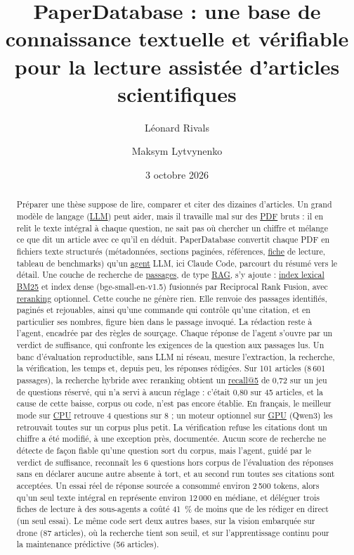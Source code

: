 \documentclass[11pt,a4paper]{article}
\title{\textbf{PaperDatabase} : une base de connaissance textuelle et vérifiable\\
  pour la lecture assistée d'articles scientifiques}
\author{Léonard Rivals \and Maksym Lytvynenko}
\date{3 octobre 2026}
\newcommand{\gl}[2]{\hyperlink{gl:#1}{\textcolor{glcolor}{#2}}}
\begin{document}
\maketitle

\begin{abstract}
Préparer une thèse suppose de lire, comparer et citer des dizaines d'articles. Un grand
modèle de langage (\gl{LLM}{LLM}) peut aider, mais il travaille mal sur des \gl{PDF}{PDF} bruts : il en relit le
texte intégral à chaque question, ne sait pas où chercher un chiffre et mélange ce que dit un
article avec ce qu'il en déduit. PaperDatabase convertit chaque PDF en fichiers texte
structurés (métadonnées, sections paginées, références, \gl{fiche}{fiche} de lecture, tableau de
benchmarks) qu'un \gl{agent}{agent} LLM, ici Claude Code, parcourt du résumé vers le détail. Une couche
de recherche de \gl{passage}{passages}, de type \gl{RAG}{RAG}, s'y ajoute : \gl{index}{index lexical} \gl{BM25}{BM25} et index dense
(bge-small-en-v1.5) fusionnés par Reciprocal Rank Fusion, avec \gl{reranking}{reranking} optionnel. Cette
couche ne génère rien. Elle renvoie des passages identifiés, paginés et rejouables, ainsi
qu'une commande qui contrôle qu'une citation, et en particulier ses nombres, figure bien
dans le passage invoqué. La rédaction reste à l'agent, encadrée par des règles de sourçage.
Chaque réponse de l'agent s'ouvre par un verdict de suffisance, qui confronte les exigences
de la question aux passages lus. Un banc d'évaluation reproductible, sans LLM ni réseau,
mesure l'extraction, la recherche, la vérification, les temps et, depuis peu, les réponses
rédigées. Sur 101 articles (8\,601 passages), la recherche hybride avec reranking obtient
un \gl{recall}{recall@5} de 0,72 sur un jeu de questions réservé, qui n'a servi à aucun réglage : c'était
0,80 sur 45 articles, et la cause de cette baisse, corpus ou code, n'est pas encore établie.
En français, le meilleur mode sur \gl{CPU}{CPU} retrouve 4 questions sur 8 ; un moteur optionnel sur
\gl{GPU}{GPU} (Qwen3) les retrouvait toutes sur un corpus plus petit. La vérification refuse les
citations dont un chiffre a été modifié, à une exception près, documentée. Aucun score de
recherche ne détecte de façon fiable qu'une question sort du corpus, mais l'agent, guidé par
le verdict de suffisance, reconnaît les 6 questions hors corpus de l'évaluation des réponses
sans en déclarer aucune autre absente à tort, et au second run toutes ses citations sont
acceptées. Un
essai réel de réponse sourcée a consommé environ 2\,500 tokens, alors qu'un seul texte
intégral en représente environ 12\,000 en médiane, et déléguer trois fiches de lecture à des
sous-agents a coûté 41~\% de moins que de les rédiger en direct (un seul essai). Le même code
sert deux autres bases, sur la vision embarquée sur drone (87 articles), où la recherche
tient son seuil, et sur l'apprentissage continu pour la maintenance prédictive (56 articles).
\end{abstract}
\end{document}
